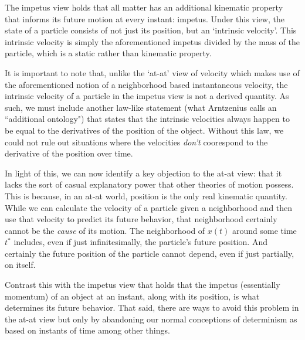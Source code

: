 \documentclass{article}
\begin{document}
The impetus view holds that all matter has an additional kinematic property that informs its future motion at every instant: impetus. Under this view, the state of a particle consists of not just its position, but an `intrinsic velocity'. This intrinsic velocity is simply the aforementioned impetus divided by the mass of the particle, which is a static rather than kinematic property.

It is important to note that, unlike the `at-at' view of velocity which makes use of the aforementioned notion of a neighborhood based instantaneous velocity, the intrinsic velocity of a particle in the impetus view is not a derived quantity. As such, we must include another law-like statement (what Arntzenius calls an ``additional ontology") that states that the intrinsic velocities always happen to be equal to the derivatives of the position of the object. Without this law, we could not rule out situations where the velocities \textit{don't} coorespond to the derivative of the position over time.
\bigskip

In light of this, we can now identify a key objection to the at-at view: that it lacks the sort of casual explanatory power that other theories of motion possess. This is because, in an at-at world, position is the only real kinematic quantity. While we can calculate the velocity of a particle given a neighborhood and then use that velocity to predict its future behavior, that neighborhood certainly cannot be the \textit{cause} of its motion. The neighborhood of $x(t)$ around some time $t^*$ includes, even if just infinitesimally, the particle's future position. And certainly the future position of the particle cannot depend, even if just partially, on itself.

Contrast this with the impetus view that holds that the impetus (essentially momentum) of an object at an instant, along with its position, is what determines its future behavior. That said, there are ways to avoid this problem in the at-at view but only by abandoning our normal conceptions of determinism as based on instants of time among other things.
\newpage

\end{document}
